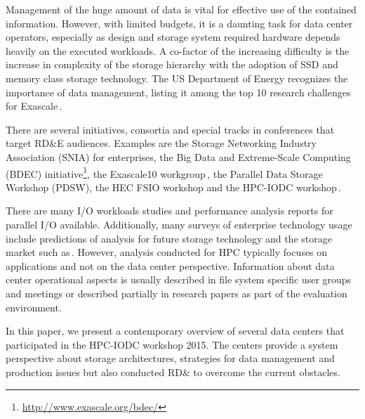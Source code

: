 \documentclass{superfri}
\numberwithin{equation}{section}
\begin{document}
Management of the huge amount of data is vital for effective use of the contained information. However, with limited budgets, it is a daunting task for data center operators,
especially as design and storage system required hardware depends heavily on the executed workloads.
A co-factor of the increasing difficulty is the increase in complexity of the storage hierarchy with the adoption of SSD and memory class storage technology.
The US Department of Energy recognizes the importance of data management, listing it among the top 10 research challenges for Exascale\,\cite{top14}. %

There are several initiatives, consortia and special tracks in conferences that target RD\&E audiences.
Examples are the Storage Networking Industry Association (SNIA) for enterprises, the 
Big Data and Extreme-Scale Computing (BDEC) initiative\footnote{\url{http://www.exascale.org/bdec/}}, the 
Exascale10 workgroup\,\cite{brinkmann14}, the Parallel Data Storage Workshop (PDSW), the HEC FSIO workshop \cite{bancroft2009} and the HPC-IODC workshop\,\cite{iodc}.

There are many I/O workloads studies and performance analysis reports for parallel I/O available.
Additionally, many surveys of enterprise technology usage include predictions of analysis for future storage technology and the storage market such as\,\cite{idc1}.
However, analysis conducted for HPC typically focuses on applications and not on the data center perspective.
Information about data center operational aspects is usually described in file system specific user groups and meetings or described partially in research papers as part of the evaluation environment.


In this paper, we present a contemporary overview of several data centers that participated in the HPC-IODC workshop 2015.
The centers provide a system perspective about storage architectures, strategies for data management and production issues but also conducted RD\& to overcome the current obstacles.
\end{document}
